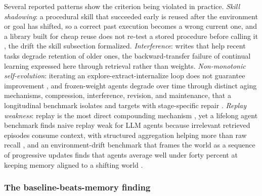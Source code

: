 Several reported patterns show the criterion being violated in practice. \emph{Skill shadowing}: a procedural skill that succeeded early is reused after the environment or goal has shifted, so a correct past execution becomes a wrong current one, and a library built for cheap reuse does not re-test a stored procedure before calling it \citep{wang2023voyageropenendedembodiedagent}, the drift the skill subsection formalized. \emph{Interference}: writes that help recent tasks degrade retention of older ones, the backward-transfer failure of continual learning expressed here through retrieval rather than weights. \emph{Non-monotonic self-evolution}: iterating an explore-extract-internalize loop does not guarantee improvement \citep{gao2025selfevolvingagentssurvey}, and frozen-weight agents degrade over time through distinct aging mechanisms, compression, interference, revision, and maintenance, that a longitudinal benchmark isolates and targets with stage-specific repair \citep{zhu2026aging}. \emph{Replay weakness}: replay is the most direct compounding mechanism \citep{liu2025contextualexperiencereplay}, yet a lifelong agent benchmark finds naive replay weak for LLM agents because irrelevant retrieved episodes consume context, with structured aggregation helping more than raw recall \citep{zheng2025lifelongagentbenchevaluatingllmagents}, and an environment-drift benchmark that frames the world as a sequence of progressive updates finds that agents average well under forty percent at keeping memory aligned to a shifting world \citep{xu2026evoarena}.

\subsubsection{The baseline-beats-memory finding}

